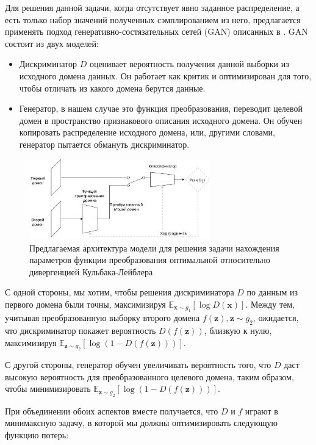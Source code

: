 \documentclass[12pt]{extarticle}
\newcommand{\bfx}{\mathbf{x}}
\newcommand{\bfz}{\mathbf{z}}
\newcommand{\expectation}{\mathbb{E}}
\begin{document}
Для решения данной задачи, когда отсутствует явно заданное распределение, а есть только набор значений полученных сэмплированием из него, предлагается применять подход генеративно-состязательных сетей (GAN) описанных в \cite{GAN_article}. GAN состоит из двух моделей:

\begin{itemize}
    \item[\textbullet] Дискриминатор $D$ оценивает вероятность получения данной выборки из исходного домена данных. Он работает как критик и оптимизирован для того, чтобы отличать из какого домена берутся данные.
    \item[\textbullet] Генератор, в нашем случае это функция преобразования, переводит целевой домен в пространство признакового описания исходного домена. Он обучен копировать распределение исходного домена, или, другими словами, генератор пытается обмануть дискриминатор.
\end{itemize}

\begin{figure}[H]\center
    \includegraphics[width=0.7\textwidth]{pictures/new_model_schema.jpg}
    \caption{Предлагаемая архитектура модели для решения задачи нахождения параметров функции преобразования оптимальной относительно дивергенцией Кульбака-Лейблера}
    \label{fig_arch}
\end{figure}

С одной стороны, мы хотим, чтобы решения дискриминатора $D$ по данным из первого домена были точны, максимизируя $\expectation_{\bfx \sim g_1}[\log D(\bfx)]$. Между тем, учитывая преобразованную выборку второго домена $f(\bfz), \bfz\sim g_2$, ожидается, что дискриминатор покажет вероятность $D(f(\bfz))$, близкую к нулю, максимизируя $\expectation_{\bfz\sim g_2} [\log(1 - D(f(\bfz)))]$.

С другой стороны, генератор обучен увеличивать вероятность того, что $D$ даст высокую вероятность для преобразованного целевого домена, таким образом, чтобы минимизировать $\expectation_{\bfz\sim g_2} [\log(1 - D(f(\bfz)))]$.

При объединении обоих аспектов вместе получается, что $D$ и $f$ играют в минимаксную задачу, в которой мы должны оптимизировать следующую функцию потерь:
\end{document}
